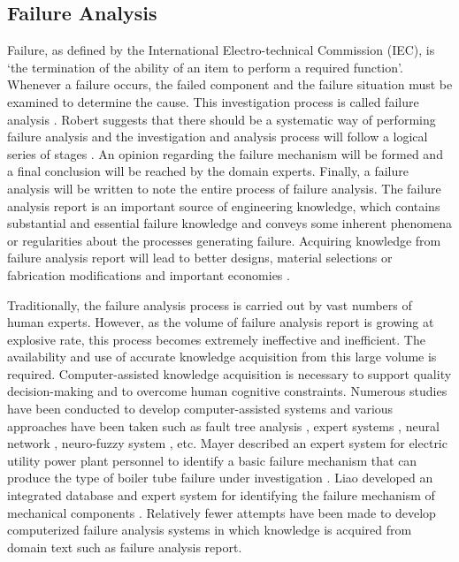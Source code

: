 \documentclass{elsarticle}
\begin{document}
\subsection{Failure Analysis
}
\label{sec:failure-analysis-}

Failure, as defined by the International Electro-technical Commission
(IEC), is ‘the termination of the ability of an item to perform a
required function’. Whenever a failure occurs, the
failed component and the failure situation must be examined to
determine the cause. This investigation process is called failure
analysis \cite{Liao1999}. Robert suggests that there should be a
systematic way of performing failure analysis and the investigation
and analysis process will follow a logical series of stages
\cite{roberts1980stm}. An opinion regarding the failure mechanism will
be formed and a final conclusion will be reached by the domain
experts. Finally, a failure analysis will be written to note the
entire process of failure analysis. The failure analysis report is an
important source of engineering knowledge, which contains substantial
and essential failure knowledge and conveys some inherent phenomena or
regularities about the processes generating failure. Acquiring
knowledge from failure analysis report will lead to better designs,
material selections or fabrication modifications and important
economies \cite{Castro2004}. 

Traditionally, the failure analysis process is carried out by vast
numbers of human experts. However, as the volume of failure analysis
report is growing at explosive rate, this process becomes extremely
ineffective and inefficient. The availability and use of accurate
knowledge acquisition from this large volume is
required. Computer-assisted knowledge acquisition is necessary to
support quality decision-making and to overcome human cognitive
constraints.  Numerous studies have been conducted to develop
computer-assisted systems and various approaches have been taken such
as fault tree analysis \cite{Israel2006}, expert systems \cite{Kim2004}, neural
network \cite{Zakarian1999}, neuro-fuzzy system \cite{Chen2006}, etc. Mayer described an expert system for electric utility power plant personnel to identify a basic failure mechanism that can produce the type of boiler tube failure under investigation \cite{Mayer1990}. Liao developed an integrated database and expert system for identifying the failure mechanism of mechanical components \cite{liao1999ida}. Relatively fewer attempts have been made to develop computerized failure analysis systems in which knowledge is acquired from domain text such as failure analysis report.
\end{document}
